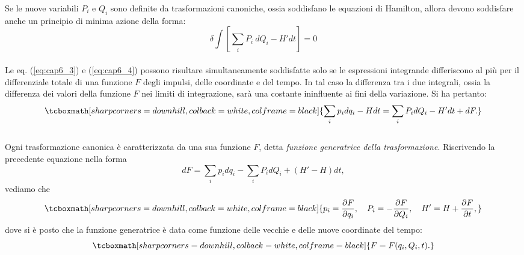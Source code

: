 Se le nuove variabili $P_i$ e $Q_i$ sono definite da trasformazioni canoniche, ossia soddisfano le equazioni di Hamilton, allora devono soddisfare anche un principio di minima azione della forma:
	\begin{equation}
		\delta \int \left[ \sum_i P_i\ dQ_i - H'dt\right] = 0
		\label{eq:cap6_4}
	\end{equation}\\
	
Le eq. (\ref{eq:cap6_3}) e (\ref{eq:cap6_4}) possono risultare simultaneamente soddisfatte solo se le espressioni integrande differiscono al pi\`u per il differenziale totale di una funzione $F$ degli impulsi, delle coordinate e del tempo. In tal caso la differenza tra i due integrali, ossia la differenza dei valori della funzione $F$ nei limiti di integrazione, sar\`a una costante ininfluente ai fini della variazione. Si ha pertanto:
	\begin{equation}
		\tcboxmath[sharp corners=downhill, colback=white, colframe=black]{
			\sum_i p_i dq_i - Hdt = \sum_i P_i d Q_i - H'dt + dF .
			}
	\end{equation}\\
	
Ogni trasformazione canonica \`e caratterizzata da una sua funzione $F$, detta \textit{funzione generatrice della trasformazione}. Riscrivendo la precedente equazione nella forma
	\begin{equation}
		dF = \sum_i p_i d q_i - \sum_i P_i dQ_i + (H'-H)dt ,
		\label{eq:cap6_5}
	\end{equation}
vediamo che
	\begin{equation}
		\tcboxmath[sharp corners=downhill, colback=white, colframe=black]{
			p_i = \frac{\partial F}{\partial q_i} , \quad P_i = - \frac{\partial F}{\partial Q_i} , \quad H' = H + \frac{\partial F}{\partial t} ,
			}
		\label{o}
	\end{equation}
dove si \`e posto che la funzione generatrice \`e data come funzione delle vecchie e delle nuove coordinate del tempo:
	\begin{equation}
		\tcboxmath[sharp corners=downhill, colback=white, colframe=black]{
			F = F(q_i, Q_i,t) .
			}
	\end{equation}\\
	
